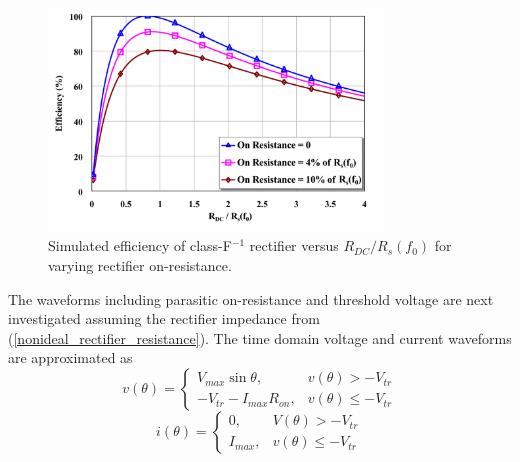 %

\begin{figure}[!b]
  \begin{center}
  \includegraphics[width=3.5in]{pdf/04.pdf}
  \caption{Simulated efficiency of class-F$^{-1}$ rectifier versus $R_{DC} / R_s(f_0)$ for varying rectifier on-resistance.}\label{sim_opt_eff_classFinv}
  \end{center}
\end{figure}

The waveforms including parasitic on-resistance and threshold voltage are next investigated assuming the rectifier impedance from (\ref{nonideal_rectifier_resistance}). The time domain voltage and current waveforms are approximated as
\begin{equation}\label{diode_voltage_waveform_finv_par}
v(\theta) =
\begin{cases}
    V_{max}\sin\theta, & v(\theta) > -V_{tr}\\
    -V_{tr} - I_{max}R_{on}, & v(\theta) \leq -V_{tr}
\end{cases}
\end{equation}
\begin{equation}\label{diode_current_waveform_finv_par}
i(\theta) =
\begin{cases}
    0, & V(\theta) > -V_{tr}\\
    I_{max}, & v(\theta) \leq -V_{tr}
\end{cases}
\end{equation}



